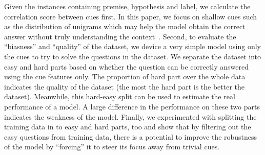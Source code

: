 Given the instances containing premise, hypothesis and label, 
we calculate the correlation score between cues first. 
In this paper, we focus on shallow cues such as the distribution of
unigrams which may help the model obtain the correct answer 
without truly understanding the 
context~\cite{naik2018stress,schuster2019towards}. 
Second, to  evaluate 
the ``biasness'' and ``quality'' of the dataset, 
we device a very simple model using only the cues to try to
solve the questions in the dataset. 
We separate the dataset into easy and hard parts based on 
whether the question can be correctly answered
using the cue features only. The proportion of hard part over the whole
data indicates the quality of the dataset (the most the hard part is the better the
dataset).
Meanwhile, 
this hard-easy split can be used to
estimate the real performance of a model. 
A large difference in the performance on these two parts indicates
the weakness of the model.
Finally, we experimented with splitting the training data 
in to easy and hard parts, too
and show that by filtering out the easy questions from training data,
there is a potential to improve the robustness of the model by ``forcing'' it
to steer its focus away from trivial cues. 

